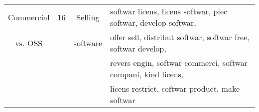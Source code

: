 \begin{table}
\begin{adjustbox}{width=0.99\textwidth}
\begin{tabular}{cccl}
\hline
Commercial& 16& Selling &
softwar licens, 
licens softwar, 
piec softwar, 
develop softwar, \\
vs. OSS&& software &
offer sell, 
distribut softwar, 
softwar free, 
softwar develop, \\
&&&revers engin, 
softwar commerci, 
softwar compani, 
kind licens, \\
&&&licens restrict, 
softwar product, 
make softwar
\\
\hline
\end{tabular}
\end{adjustbox}
\end{table}